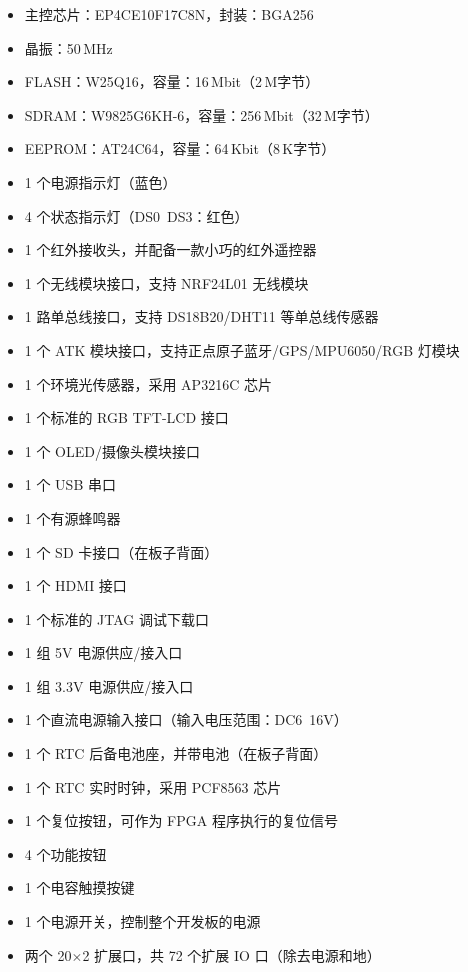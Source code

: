 \documentclass[UTF8]{article}
\theoremstyle{MyLineTheoremStyle} %
\theoremstyle{MyBlockTheoremStyle} %
\theoremstyle{MySubsubsectionStyle} %
\begin{document}
\begin{itemize}
    \item 主控芯片：EP4CE10F17C8N，封装：BGA256
    \item 晶振：50\,MHz
    \item FLASH：W25Q16，容量：16\,Mbit（2\,M字节）
    \item SDRAM：W9825G6KH-6，容量：256\,Mbit（32\,M字节）
    \item EEPROM：AT24C64，容量：64\,Kbit（8\,K字节）
    \item 1 个电源指示灯（蓝色）
    \item 4 个状态指示灯（DS0~DS3：红色）
    \item 1 个红外接收头，并配备一款小巧的红外遥控器
    \item 1 个无线模块接口，支持 NRF24L01 无线模块
    \item 1 路单总线接口，支持 DS18B20/DHT11 等单总线传感器
    \item 1 个 ATK 模块接口，支持正点原子蓝牙/GPS/MPU6050/RGB 灯模块
    \item 1 个环境光传感器，采用 AP3216C 芯片
    \item 1 个标准的 RGB TFT-LCD 接口
    \item 1 个 OLED/摄像头模块接口
    \item 1 个 USB 串口
    \item 1 个有源蜂鸣器
    \item 1 个 SD 卡接口（在板子背面）
    \item 1 个 HDMI 接口
    \item 1 个标准的 JTAG 调试下载口
    \item 1 组 5V 电源供应/接入口
    \item 1 组 3.3V 电源供应/接入口
    \item 1 个直流电源输入接口（输入电压范围：DC6~16V）
    \item 1 个 RTC 后备电池座，并带电池（在板子背面）
    \item 1 个 RTC 实时时钟，采用 PCF8563 芯片
    \item 1 个复位按钮，可作为 FPGA 程序执行的复位信号
    \item 4 个功能按钮
    \item 1 个电容触摸按键
    \item 1 个电源开关，控制整个开发板的电源
    \item 两个 20$\times$2 扩展口，共 72 个扩展 IO 口（除去电源和地）
\end{itemize}

\vspace{1cm}
\end{document}
